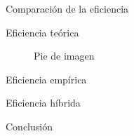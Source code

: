 \documentclass[12pt]{beamer}
\begin{document}
\begin{frame}{Comparación de la eficiencia}

\begin{block}{Eficiencia teórica}
\begin{figure}[H] 
\centering
\caption{Pie de imagen} 
\label{etiqueta} 
\end{figure}
\end{block}

\begin{block}{Eficiencia empírica}

\end{block}

\begin{block}{Eficiencia híbrida}

\end{block}

\end{frame}

\begin{frame}{Conclusión}

\end{frame}
\end{document}
